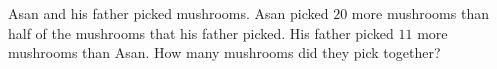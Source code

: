 Asan and his father picked mushrooms. Asan picked $20$ more mushrooms than half of the mushrooms that his father picked. His father picked $11$ more mushrooms than Asan. How many mushrooms did they pick together?
